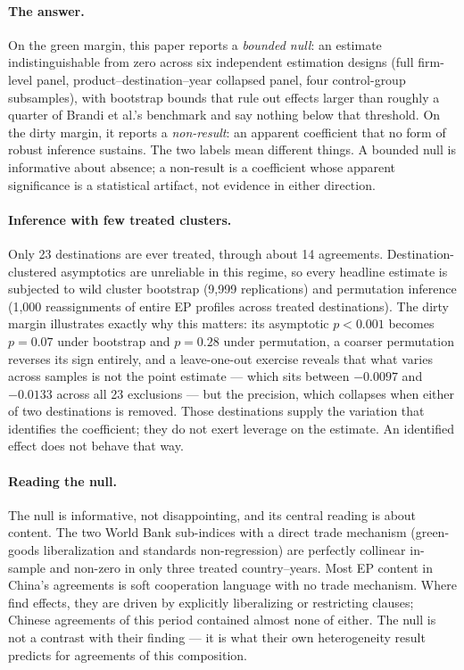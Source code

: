 \documentclass[12pt]{article}
\begin{document}
\paragraph{The answer.}
On the green margin, this paper reports a \emph{bounded null}: an estimate
indistinguishable from zero across six independent estimation designs (full firm-level
panel, product--destination--year collapsed panel, four control-group subsamples), with
bootstrap bounds that rule out effects larger than roughly a quarter of Brandi et al.'s
benchmark and say nothing below that threshold. On the dirty margin, it reports a
\emph{non-result}: an apparent coefficient that no form of robust inference sustains. The
two labels mean different things. A bounded null is informative about absence; a
non-result is a coefficient whose apparent significance is a statistical artifact, not
evidence in either direction.

\paragraph{Inference with few treated clusters.}
Only 23 destinations are ever treated, through about 14 agreements. Destination-clustered
asymptotics are unreliable in this regime, so every headline estimate is subjected to wild
cluster bootstrap (9{,}999 replications) and permutation inference (1{,}000 reassignments
of entire EP profiles across treated destinations). The dirty margin illustrates exactly
why this matters: its asymptotic $p < 0.001$ becomes $p = 0.07$ under bootstrap and
$p = 0.28$ under permutation, a coarser permutation reverses its sign entirely, and a
leave-one-out exercise reveals that what varies across samples is not the point estimate
--- which sits between $-0.0097$ and $-0.0133$ across all 23 exclusions --- but the
precision, which collapses when either of two destinations is removed. Those destinations
supply the variation that identifies the coefficient; they do not exert leverage on the
estimate. An identified effect does not behave that way.

\paragraph{Reading the null.}
The null is informative, not disappointing, and its central reading is about content. The
two World Bank sub-indices with a direct trade mechanism (green-goods liberalization and
standards non-regression) are perfectly collinear in-sample and non-zero in only three
treated country--years. Most EP content in China's agreements is soft cooperation
language with no trade mechanism. Where \citet{brandi2020} find effects, they are driven
by explicitly liberalizing or restricting clauses; Chinese agreements of this period
contained almost none of either. The null is not a contrast with their finding --- it is
what their own heterogeneity result predicts for agreements of this composition.
\end{document}
